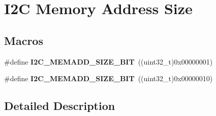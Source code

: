\hypertarget{group___i2_c___memory___address___size}{\section{I2\-C Memory Address Size}
\label{group___i2_c___memory___address___size}
}
\subsection*{Macros}
\begin{DoxyCompactItemize}
\item 
\hypertarget{group___i2_c___memory___address___size_ga44007b689fa80deeab22820ad0b2dc6d}{\#define {\bfseries I2\-C\-\_\-\-M\-E\-M\-A\-D\-D\-\_\-\-S\-I\-Z\-E\-\_\-B\-I\-T}~((uint32\-\_\-t)0x00000001)}\label{group___i2_c___memory___address___size_ga44007b689fa80deeab22820ad0b2dc6d}

\item 
\hypertarget{group___i2_c___memory___address___size_ga5b8c4b7d245fd7ab998acf2c7edd61a4}{\#define {\bfseries I2\-C\-\_\-\-M\-E\-M\-A\-D\-D\-\_\-\-S\-I\-Z\-E\-\_\-B\-I\-T}~((uint32\-\_\-t)0x00000010)}\label{group___i2_c___memory___address___size_ga5b8c4b7d245fd7ab998acf2c7edd61a4}

\end{DoxyCompactItemize}


\subsection{Detailed Description}
